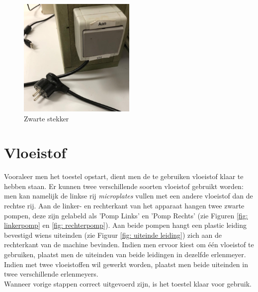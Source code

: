 \documentclass[a4paper,twoside,kulak]{kulakreport} %
\begin{document}
\begin{figure}[h]
	\centering
	\includegraphics[width=0.5\textwidth]{stekker.png}
	\caption{Zwarte stekker}
	\label{fig:stekker}
	
\end{figure} 







\section{Vloeistof}

Vooraleer men het toestel opstart, dient men de te gebruiken vloeistof klaar te hebben staan. Er kunnen twee verschillende soorten vloeistof gebruikt worden: men kan namelijk de linkse rij \textit{microplates} vullen met een andere vloeistof dan de rechtse rij. Aan de linker- en rechterkant van het apparaat hangen twee zwarte pompen, deze zijn gelabeld als 'Pomp Links' en 'Pomp Rechts' (zie Figuren \ref{fig: linkerpomp} en \ref{fig: rechterpomp}). Aan beide pompen hangt een plastic leiding bevestigd wiens uiteinden (zie Figuur \ref{fig: uiteinde leiding}) zich aan de rechterkant van de machine bevinden. Indien men ervoor kiest om één vloeistof te gebruiken, plaatst men de uiteinden van beide leidingen in dezelfde erlenmeyer. Indien met twee vloeistoffen wil gewerkt worden, plaatst men beide uiteinden in twee verschillende erlenmeyers. \\ Wanneer vorige stappen correct uitgevoerd zijn, is het toestel klaar voor gebruik.
\end{document}
